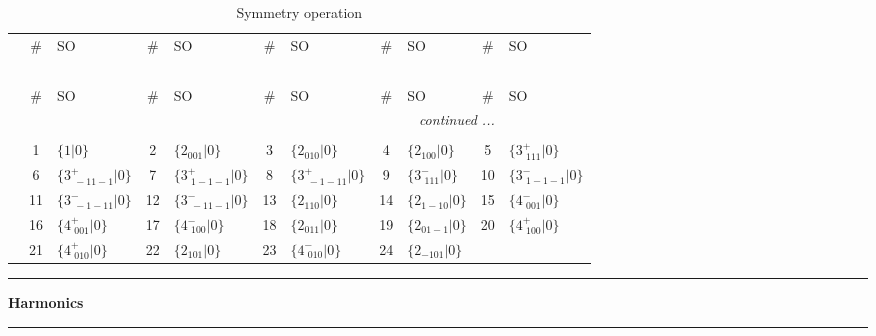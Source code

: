 \documentclass[fleqn,10pt,landscape]{jsarticle}
\begin{document}
\renewcommand{\arraystretch}{1.6}
\begin{longtable}[l]{c|cl|cl|cl|cl|cl}
\captionsetup{justification=raggedright, singlelinecheck=off}
\caption{Symmetry operation}
 \\
 \hline \hline
 & \# & SO & \# & SO & \# & SO & \# & SO & \# & SO \\ \hline \endfirsthead

\multicolumn{10}{l}{\tablename\ \thetable{}} \\
 \hline \hline
 & \# & SO & \# & SO & \# & SO & \# & SO & \# & SO \\ \hline \endhead

 \hline \hline
\multicolumn{10}{r}{\footnotesize\it continued ...} \\ \endfoot

 \hline \hline
\multicolumn{10}{r}{} \\ \endlastfoot

 & 1 & $\{1|0\}$ & 2 & $\{2{}_{001}|0\}$ & 3 & $\{2{}_{010}|0\}$ & 4 & $\{2{}_{100}|0\}$ & 5 & $\{3^{+}_{\,\,111}|0\}$ \\
& 6 & $\{3^{+}_{\,\,-11-1}|0\}$ & 7 & $\{3^{+}_{\,\,1-1-1}|0\}$ & 8 & $\{3^{+}_{\,\,-1-11}|0\}$ & 9 & $\{3^{-}_{\,\,111}|0\}$ & 10 & $\{3^{-}_{\,\,1-1-1}|0\}$ \\
& 11 & $\{3^{-}_{\,\,-1-11}|0\}$ & 12 & $\{3^{-}_{\,\,-11-1}|0\}$ & 13 & $\{2{}_{110}|0\}$ & 14 & $\{2{}_{1-10}|0\}$ & 15 & $\{4^{-}_{\,\,001}|0\}$ \\
& 16 & $\{4^{+}_{\,\,001}|0\}$ & 17 & $\{4^{-}_{\,\,100}|0\}$ & 18 & $\{2{}_{011}|0\}$ & 19 & $\{2{}_{01-1}|0\}$ & 20 & $\{4^{+}_{\,\,100}|0\}$ \\
& 21 & $\{4^{+}_{\,\,010}|0\}$ & 22 & $\{2{}_{101}|0\}$ & 23 & $\{4^{-}_{\,\,010}|0\}$ & 24 & $\{2{}_{-101}|0\}$ &  &  \\
\end{longtable}
\vspace{5mm}
\noindent \rule[0.5mm]{5mm}{0.5mm}\hspace{3mm}\textbf{Harmonics}\hspace{3mm}\leaders\hrule height 0.5mm\hfill\kern0pt
\vspace{3mm}
\end{document}
